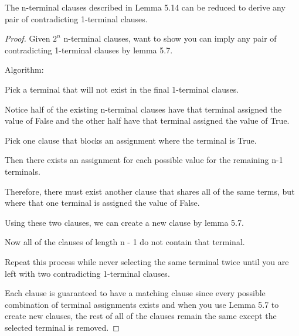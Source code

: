 \documentclass[manuscript]{acmart}
\begin{document}
    \begin{lemma}
        The n-terminal clauses described in Lemma 5.14 can be reduced to derive any pair of contradicting 1-terminal clauses.
    \end{lemma}
    \begin{proof}
        Given $2^n$ n-terminal clauses, want to show you can imply any pair of contradicting 1-terminal clauses by lemma 5.7.

        Algorithm: 

        Pick a terminal that will not exist in the final 1-terminal clauses.

        Notice half of the existing n-terminal clauses have that terminal assigned the value of False and the other half have that terminal assigned the value of True.

        Pick one clause that blocks an assignment where the terminal is True.

        Then there exists an assignment for each possible value for the remaining n-1 terminals.

        Therefore, there must exist another clause that shares all of the same terms, but where that one terminal is assigned the value of False.

        Using these two clauses, we can create a new clause by lemma 5.7.

        Now all of the clauses of length n - 1 do not contain that terminal.

        Repeat this process while never selecting the same terminal twice
        until you are left with two contradicting 1-terminal clauses.

        Each clause is guaranteed to have a matching clause since every possible combination of terminal assignments exists and when you use Lemma 5.7 to create new clauses, the rest of all of the clauses remain the same except the selected terminal is removed.
    \end{proof}
\end{document}
